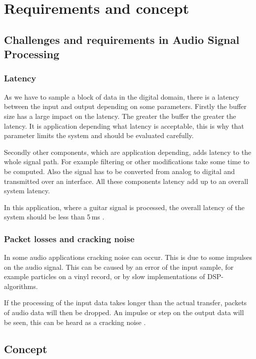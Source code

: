 \section{Requirements and concept}

\subsection{Challenges and requirements in Audio Signal Processing}

\subsubsection{Latency}

As we have to sample a block of data in the digital domain, there is a latency between the input and output
depending on some parameters. Firstly the buffer size has a large impact on the latency. The greater the buffer the
greater the latency. It is application depending what latency is acceptable, this is why that parameter
limits the system and should be evaluated carefully.

Secondly other components, which are application depending, adds latency to the whole signal path.
For example filtering or other modifications take some time to be computed. Also the signal has to
be converted from analog to digital and transmitted over an interface. All these components latency add
up to an overall system latency. 

In this application, where a guitar signal is processed, the overall latency of the system should be less
than 5\,ms \cite{beckmann_dsp}.

\subsubsection{Packet losses and cracking noise}

In some audio applications cracking noise can occur. This is due to
some impulses on the audio signal. This can be caused by an error of the input sample, for example particles
on a vinyl record, or by slow implementations of \ac{DSP}-algorithms.

If the processing of the input data takes longer than the actual transfer, packets of audio data will
then be dropped. An impulse or step on the output data will be seen, this can be heard as a cracking noise
\cite{stotz_audio_video}.

\subsection{Concept}

